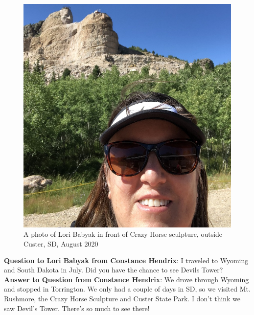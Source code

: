 \begin{figure} [h!]
    \centering
    \includegraphics[width=.4\textwidth]{LoriSDSmall.JPG} 
    \caption{A photo of Lori Babyak in front of Crazy Horse sculpture, outside Custer, SD, August 2020}
\end{figure}


\textbf{Question  to Lori Babyak from Constance Hendrix}:  I traveled to Wyoming and South Dakota in July.  Did you have the chance to see Devils Tower?
\textbf{Answer to Question from Constance Hendrix}: We drove through Wyoming and stopped in Torrington.  We only had a couple of days in SD, so we visited Mt. Rushmore, the Crazy Horse Sculpture and Custer State Park.  I don't think we saw Devil's Tower. There's so much to see there!
